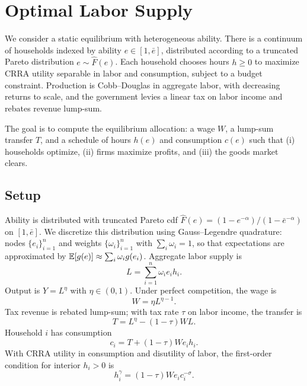 \section{Optimal Labor Supply}


We consider a static equilibrium with heterogeneous ability. There is a continuum of households indexed by ability $e \in [1,\bar{e}]$, distributed according to a truncated Pareto distribution $e \sim \widehat{F}(e)$. Each household chooses hours $h \ge 0$ to maximize CRRA utility separable in labor and consumption, subject to a budget constraint. Production is Cobb--Douglas in aggregate labor, with decreasing returns to scale, and the government levies a linear tax on labor income and rebates revenue lump-sum.

The goal is to compute the equilibrium allocation: a wage $W$, a lump-sum transfer $T$, and a schedule of hours $h(e)$ and consumption $c(e)$ such that (i) households optimize, (ii) firms maximize profits, and (iii) the goods market clears.

\subsection{Setup}

Ability is distributed with truncated Pareto cdf $\widehat{F}(e) = (1 - e^{-\alpha}) / (1 - \bar{e}^{-\alpha})$ on $[1,\bar{e}]$. We discretize this distribution using Gauss--Legendre quadrature: nodes $\{e_i\}_{i=1}^n$ and weights $\{\omega_i\}_{i=1}^n$ with $\sum_i \omega_i = 1$, so that expectations are approximated by $\mathbb{E}[g(e)] \approx \sum_i \omega_i g(e_i)$. Aggregate labor supply is
\begin{equation}
  L = \sum_{i=1}^n \omega_i e_i h_i.
\end{equation}
Output is $Y = L^\eta$ with $\eta \in (0,1)$. Under perfect competition, the wage is
\begin{equation}
  W = \eta L^{\eta - 1}.
\end{equation}
Tax revenue is rebated lump-sum; with tax rate $\tau$ on labor income, the transfer is
\begin{equation}
  T = L^\eta - (1-\tau) W L.
\end{equation}
Household $i$ has consumption
\begin{equation}
  c_i = T + (1-\tau) W e_i h_i.
\end{equation}
With CRRA utility in consumption and disutility of labor, the first-order condition for interior $h_i > 0$ is
\begin{equation}
  h_i^\gamma = (1-\tau) W e_i c_i^{-\sigma}.
\end{equation}

